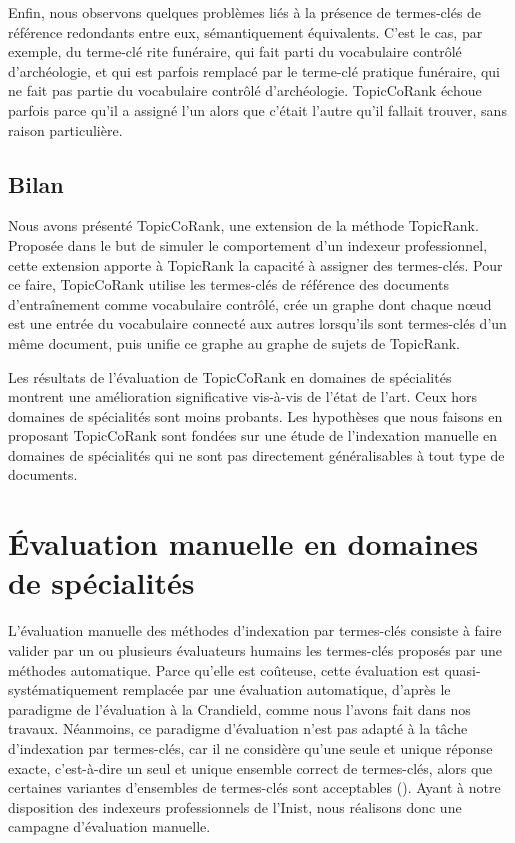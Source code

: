         Enfin, nous observons quelques problèmes liés à la présence de
        termes-clés de référence redondants entre eux, sémantiquement
        équivalents. C'est le cas, par exemple, du terme-clé \og{}rite
        funéraire\fg{}, qui fait parti du vocabulaire contrôlé d'archéologie, et
        qui est parfois remplacé par le terme-clé \og{}pratique funéraire\fg{},
        qui ne fait pas partie du vocabulaire contrôlé d'archéologie.
        TopicCoRank échoue parfois parce qu'il a assigné l'un alors que c'était
        l'autre qu'il fallait trouver, sans raison particulière.

    \subsection{Bilan}
    \label{subsec:main-domain_specific_keyphrase_annotation-supervised_automatic_keyphrase_annotation-conclusion}
      Nous avons présenté TopicCoRank, une extension de la méthode TopicRank.
      Proposée dans le but de simuler le comportement d'un indexeur
      professionnel, cette extension apporte à TopicRank la capacité à assigner
      des termes-clés. Pour ce faire, TopicCoRank utilise les termes-clés de
      référence des documents d'entraînement comme vocabulaire contrôlé, crée un
      graphe dont chaque n\oe{}ud est une entrée du vocabulaire connecté aux
      autres lorsqu'ils sont termes-clés d'un même document, puis unifie ce
      graphe au graphe de sujets de TopicRank.

      Les résultats de l'évaluation de TopicCoRank en domaines de spécialités
      montrent une amélioration significative vis-à-vis de l'état de l'art. Ceux
      hors domaines de spécialités sont moins probants. Les hypothèses que nous
      faisons en proposant TopicCoRank sont fondées sur une étude de
      l'indexation manuelle en domaines de spécialités qui ne sont pas
      directement généralisables à tout type de documents.


  \section{Évaluation manuelle en domaines de spécialités}
  \label{sec:main-domain_specific_keyphrase_annotation-manual_evaluation}
    L'évaluation manuelle des méthodes d'indexation par termes-clés consiste à
    faire valider par un ou plusieurs évaluateurs humains les termes-clés
    proposés par une méthodes automatique. Parce qu'elle est coûteuse, cette
    évaluation est quasi-systématiquement remplacée par une évaluation
    automatique, d'après le paradigme de l'évaluation \og{}à la Crandield\fg{},
    comme nous l'avons fait dans nos travaux. Néanmoins, ce paradigme
    d'évaluation n'est pas adapté à la tâche d'indexation par termes-clés, car
    il ne considère qu'une seule et unique réponse exacte, c'est-à-dire un seul
    et unique ensemble correct de termes-clés, alors que certaines variantes
    d'ensembles de termes-clés sont acceptables (). Ayant à notre
    disposition des indexeurs professionnels de l'Inist, nous réalisons donc une
    campagne d'évaluation manuelle.


